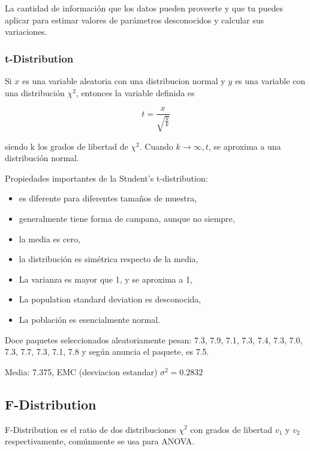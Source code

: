 \documentclass[]{article}
\begin{document}
La cantidad de información que los datos pueden proveerte y que tu puedes aplicar para estimar valores de parámetros desconocidos y calcular sus variaciones.

\subsubsection{t-Distribution}

Si $x$ es una variable aleatoria con una distribucion normal y $y$ es una variable con una distribución $\chi^2$, entonces la variable definida es

\begin{equation}
 t = \frac{x}{\sqrt{\frac{y}{k}}}
\end{equation}

siendo k los grados de libertad de $\chi^2$. Cuando $k \longrightarrow \infty, t$, se aproxima a una distribución normal.

Propiedades importantes de la Student's t-distribution:
\begin{itemize}
	\item es diferente para diferentes tamaños de muestra,
	\item generalmente tiene forma de campana, aunque no siempre,
	\item la media es cero,
	\item la distribución es simétrica respecto de la media,
	\item La varianza es mayor que 1, y se aproxima a 1,
	\item La population standard deviation es desconocida,
	\item La población es esencialmente normal.
\end{itemize}

Doce paquetes seleccionados aleatoriamente pesan: 7.3, 7.9, 7.1, 7.3, 7.4, 7.3, 7.0, 7.3, 7.7, 7.3, 7.1, 7.8 y según anuncia el paquete, es 7.5. 

Media: 7.375, EMC (desviacion estandar) $\sigma^2 = 0.2832$

\subsection{F-Distribution}

F-Distribution es el ratio de dos distribuciones $\chi^2$ con grados de libertad $v_1$ y $v_2$ respectivamente, comúnmente se usa para ANOVA.
\end{document}
